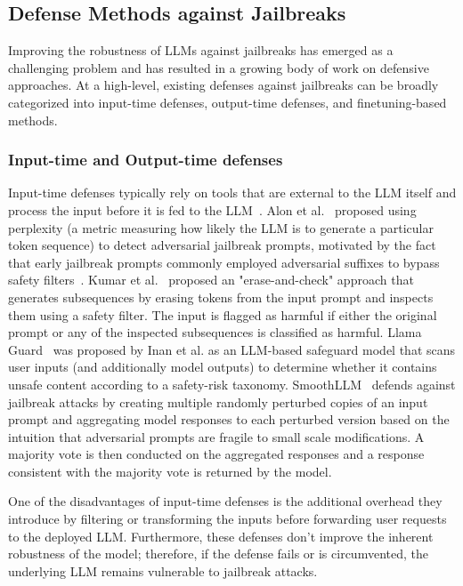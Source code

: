\subsection{Defense Methods against Jailbreaks}
\label{subsec:related_work:defenses}

Improving the robustness of LLMs against jailbreaks has emerged as a challenging problem and has resulted in a growing body of work on defensive approaches. At a high-level, existing defenses against jailbreaks can be broadly categorized into input-time defenses, output-time defenses, and finetuning-based methods. 

\subsubsection{Input-time and Output-time defenses}

Input-time defenses typically rely on tools that are external to the LLM itself and process the input before it is fed to the LLM~\cite{alon2023perplexity, kumar2024certifying, Inan2023llamaguard}. Alon et al.~\cite{alon2023perplexity} proposed using perplexity (a metric measuring how likely the LLM is to generate a particular token sequence) to detect adversarial jailbreak prompts, motivated by the fact that early jailbreak prompts commonly employed adversarial suffixes to bypass safety filters~\cite{zou2023GCG}. Kumar et al.~\cite{kumar2024certifying} proposed an "erase-and-check" approach that generates subsequences by erasing tokens from the input prompt and inspects them using a safety filter. The input is flagged as harmful if either the original prompt or any of the inspected subsequences is classified as harmful. Llama Guard~\cite{Inan2023llamaguard} was proposed by Inan et al. as an LLM-based safeguard model that scans user inputs (and additionally model outputs) to determine whether it contains unsafe content according to a safety-risk taxonomy. SmoothLLM~\cite{robey2025smoothllm} defends against jailbreak attacks by creating multiple randomly perturbed copies of an input prompt and aggregating model responses to each perturbed version based on the intuition that adversarial prompts are fragile to small scale modifications. A majority vote is then conducted on the aggregated responses and a response consistent with the majority vote is returned by the model.

One of the disadvantages of input-time defenses is the additional overhead they introduce by filtering or transforming the inputs before forwarding user requests to the deployed LLM. Furthermore, these defenses don't improve the inherent robustness of the model; therefore, if the defense fails or is circumvented, the underlying LLM remains vulnerable to jailbreak attacks.

